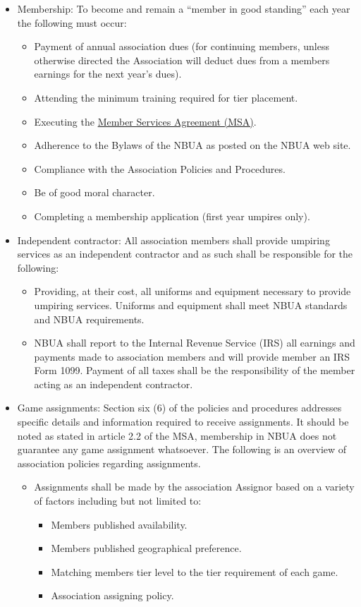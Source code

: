 \documentclass[letterpaper,11pt,colorlinks=true,allcolors=blue]{article}
\begin{document}
\begin{itemize}
\item Membership: To become and remain a “member in good standing” each year the following must occur:
\begin{itemize}
\item Payment of annual association dues (for continuing members, unless otherwise directed the Association will deduct dues from a members earnings for the next year’s dues).
\item Attending the minimum training required for tier placement.
\item Executing the \href{http://www.nbua.net/members/msa/}{Member Services Agreement (MSA)}.
\item Adherence to the Bylaws of the NBUA as posted on the NBUA web site.
\item Compliance with the Association Policies and Procedures.
\item Be of good moral character.
\item Completing a membership application (first year umpires only).
\end{itemize}

\item Independent contractor: All association members shall provide umpiring services as an independent contractor and as such shall be responsible for the following: 
\begin{itemize}
\item Providing, at their cost, all uniforms and equipment necessary to provide umpiring services. Uniforms and equipment shall meet NBUA standards and NBUA requirements.
\item NBUA shall report to the Internal Revenue Service (IRS) all earnings and payments made to association members and will provide member an IRS Form 1099. Payment of all taxes shall be the responsibility of the member acting as an independent contractor.
\end{itemize}

\item Game assignments: Section six (6) of the policies and procedures addresses specific details and information required to receive assignments. It should be noted as stated in article 2.2 of the MSA, membership in NBUA does not guarantee any game assignment whatsoever. The following is an overview of association policies regarding assignments.
\begin{itemize}
\item Assignments shall be made by the association Assignor based on a variety of factors including but not limited to:
\begin{itemize}
\item Members published availability.
\item Members published geographical preference. 
\item Matching members tier level to the tier requirement of each game.
\item Association assigning policy.
\end{itemize}
\end{itemize}


\end{itemize}
\end{document}
